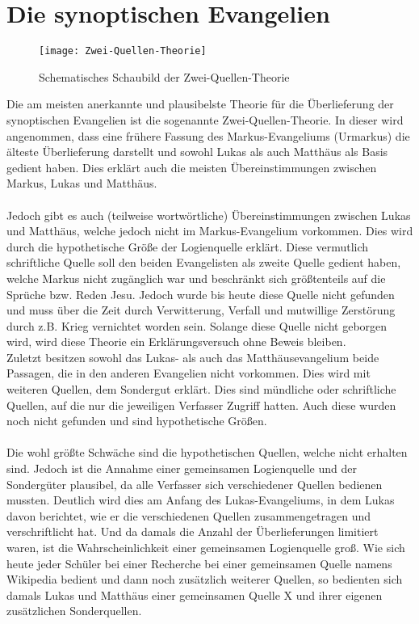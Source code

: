 \section{Die synoptischen Evangelien}
\begin{figure}[h]
    \begin{center}
        \texttt{[image: Zwei-Quellen-Theorie]}\label{Quellentheorie}
        \caption{Schematisches Schaubild der Zwei-Quellen-Theorie}
    \end{center}
\end{figure}
Die am meisten anerkannte und plausibelste Theorie für die Überlieferung der synoptischen Evangelien ist die sogenannte Zwei-Quellen-Theorie. In dieser wird angenommen, dass eine frühere Fassung des Markus-Evangeliums (Urmarkus) die älteste Überlieferung darstellt und sowohl Lukas als auch Matthäus als Basis gedient haben. Dies erklärt auch die meisten Übereinstimmungen zwischen Markus, Lukas und Matthäus.
\\~\\
Jedoch gibt es auch (teilweise wortwörtliche) Übereinstimmungen  zwischen Lukas und Matthäus, welche jedoch nicht im Markus-Evangelium vorkommen. Dies wird durch die hypothetische Größe der Logienquelle erklärt. Diese vermutlich schriftliche Quelle soll den beiden Evangelisten als zweite Quelle gedient haben, welche Markus nicht zugänglich war und beschränkt sich größtenteils auf die Sprüche bzw. Reden Jesu. Jedoch wurde bis heute diese Quelle nicht gefunden und muss über die Zeit durch Verwitterung, Verfall und mutwillige Zerstörung durch z.B. Krieg vernichtet worden sein. Solange diese Quelle nicht geborgen wird, wird diese Theorie ein Erklärungsversuch ohne Beweis bleiben.
\pagebreak
\\
Zuletzt besitzen sowohl das Lukas- als auch das Matthäusevangelium beide Passagen, die in den anderen Evangelien nicht vorkommen. Dies wird mit weiteren Quellen, dem Sondergut erklärt. Dies sind mündliche oder schriftliche Quellen, auf die nur die jeweiligen Verfasser Zugriff hatten. Auch diese wurden noch nicht gefunden und sind hypothetische Größen.
\\~\\
Die wohl größte Schwäche sind die hypothetischen Quellen, welche nicht erhalten sind. Jedoch ist die Annahme einer gemeinsamen Logienquelle und der Sondergüter plausibel, da alle Verfasser sich verschiedener Quellen bedienen mussten. Deutlich wird dies am Anfang des Lukas-Evangeliums, in dem Lukas davon berichtet, wie er die verschiedenen Quellen zusammengetragen und verschriftlicht hat. Und da damals die Anzahl der Überlieferungen limitiert waren, ist die Wahrscheinlichkeit einer gemeinsamen Logienquelle groß. Wie sich heute jeder Schüler bei einer Recherche bei einer gemeinsamen Quelle namens Wikipedia bedient und dann noch zusätzlich weiterer Quellen, so bedienten sich damals Lukas und Matthäus einer gemeinsamen Quelle X und ihrer eigenen zusätzlichen Sonderquellen.
